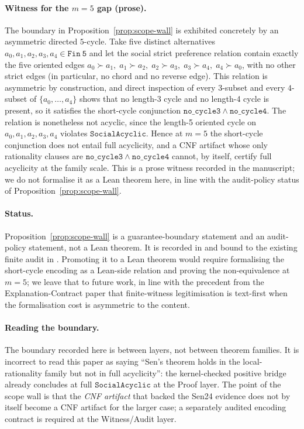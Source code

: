 \paragraph{Witness for the $m=5$ gap (prose).}
The boundary in Proposition~\ref{prop:scope-wall} is exhibited concretely by an asymmetric directed $5$-cycle.
Take five distinct alternatives $a_0,a_1,a_2,a_3,a_4 \in \mathtt{Fin\ 5}$ and let the social strict preference relation contain exactly the five oriented edges
\(a_0 \succ a_1,\; a_1 \succ a_2,\; a_2 \succ a_3,\; a_3 \succ a_4,\; a_4 \succ a_0\),
with no other strict edges (in particular, no chord and no reverse edge).
This relation is asymmetric by construction, and direct inspection of every $3$-subset and every $4$-subset of $\{a_0,\dots,a_4\}$ shows that no length-3 cycle and no length-4 cycle is present, so it satisfies the short-cycle conjunction \(\mathtt{no\_cycle3} \wedge \mathtt{no\_cycle4}\).
The relation is nonetheless not acyclic, since the length-5 oriented cycle on $a_0,a_1,a_2,a_3,a_4$ violates \(\mathtt{SocialAcyclic}\).
Hence at \(m = 5\) the short-cycle conjunction does not entail full acyclicity, and a CNF artifact whose only rationality clauses are \(\mathtt{no\_cycle3} \wedge \mathtt{no\_cycle4}\) cannot, by itself, certify full acyclicity at the family scale.
This is a prose witness recorded in the manuscript; we do not formalise it as a Lean theorem here, in line with the audit-policy status of Proposition~\ref{prop:scope-wall}.

\paragraph{Status.}
Proposition~\ref{prop:scope-wall} is a guarantee-boundary statement and an audit-policy statement, not a Lean theorem.
It is recorded in  and bound to the existing finite audit in .
Promoting it to a Lean theorem would require formalising the short-cycle encoding as a Lean-side relation and proving the non-equivalence at \(m = 5\); we leave that to future work, in line with the precedent from the Explanation-Contract paper that finite-witness legitimisation is text-first when the formalisation cost is asymmetric to the content.

\paragraph{Reading the boundary.}
The boundary recorded here is between layers, not between theorem families.
It is incorrect to read this paper as saying ``Sen's theorem holds in the local-rationality family but not in full acyclicity'': the kernel-checked positive bridge already concludes at full \(\mathtt{SocialAcyclic}\) at the Proof layer.
The point of the scope wall is that the \emph{CNF artifact} that backed the Sen24 evidence does not by itself become a CNF artifact for the larger case; a separately audited encoding contract is required at the Witness/Audit layer.

